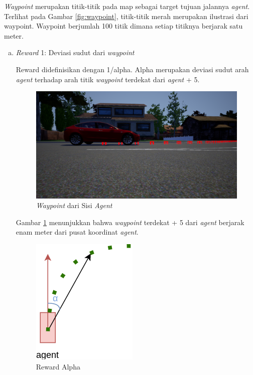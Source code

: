 \documentclass[conference]{IEEEtran}
\begin{document}
\textit{Waypoint} merupakan titik-titik pada map sebagai target tujuan jalannya \textit{agent}. Terlihat pada Gambar \ref{fig:waypoint}, titik-titik merah merupakan ilustrasi dari waypoint. Waypoint berjumlah 100 titik dimana setiap titiknya berjarak satu meter.

\begin{enumerate}[a)]
\item \textit{Reward} 1: Deviasi sudut dari \textit{waypoint}

Reward didefinisikan dengan 1/alpha. Alpha merupakan deviasi sudut arah \textit{agent }terhadap arah titik \textit{waypoint} terdekat dari \textit{agent} + 5.

\begin{figure}[H] 
	\centering
	\includegraphics[width=1\linewidth]{images/waypoint_fromside}
	\caption{\textit{Waypoint }dari Sisi \textit{Agent}}
	\label{fig:waypoint_fromside}
\end{figure}

Gambar \ref{fig:waypoint_fromside} menunjukkan bahwa \textit{waypoint} terdekat + 5 dari \textit{agent} berjarak enam meter dari pusat koordinat \textit{agent}.

\begin{figure}[H] 
	\centering
	\includegraphics[width=.5\linewidth]{images/reward_alpha}
	\caption{Reward Alpha}
	\label{fig:reward_alpha}
\end{figure}


\end{enumerate}
\end{document}
